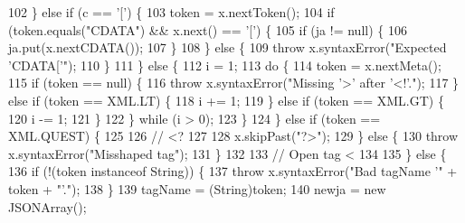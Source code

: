 \begin{DoxyCode}
102                         \} \textcolor{keywordflow}{else} \textcolor{keywordflow}{if} (c == \textcolor{charliteral}{'['}) \{
103                             token = x.nextToken();
104                             \textcolor{keywordflow}{if} (token.equals(\textcolor{stringliteral}{"CDATA"}) && x.next() == \textcolor{charliteral}{'['}) \{
105                                 \textcolor{keywordflow}{if} (ja != null) \{
106                                     ja.put(x.nextCDATA());
107                                 \}
108                             \} \textcolor{keywordflow}{else} \{
109                                 \textcolor{keywordflow}{throw} x.syntaxError(\textcolor{stringliteral}{"Expected 'CDATA['"});
110                             \}
111                         \} \textcolor{keywordflow}{else} \{
112                             i = 1;
113                             \textcolor{keywordflow}{do} \{
114                                 token = x.nextMeta();
115                                 \textcolor{keywordflow}{if} (token == null) \{
116                                     \textcolor{keywordflow}{throw} x.syntaxError(\textcolor{stringliteral}{"Missing '>' after '<!'."});
117                                 \} \textcolor{keywordflow}{else} \textcolor{keywordflow}{if} (token == XML.LT) \{
118                                     i += 1;
119                                 \} \textcolor{keywordflow}{else} \textcolor{keywordflow}{if} (token == XML.GT) \{
120                                     i -= 1;
121                                 \}
122                             \} \textcolor{keywordflow}{while} (i > 0);
123                         \}
124                     \} \textcolor{keywordflow}{else} \textcolor{keywordflow}{if} (token == XML.QUEST) \{
125 
126 \textcolor{comment}{// <?}
127 
128                         x.skipPast(\textcolor{stringliteral}{"?>"});
129                     \} \textcolor{keywordflow}{else} \{
130                         \textcolor{keywordflow}{throw} x.syntaxError(\textcolor{stringliteral}{"Misshaped tag"});
131                     \}
132 
133 \textcolor{comment}{// Open tag <}
134 
135                 \} \textcolor{keywordflow}{else} \{
136                     \textcolor{keywordflow}{if} (!(token instanceof String)) \{
137                         \textcolor{keywordflow}{throw} x.syntaxError(\textcolor{stringliteral}{"Bad tagName '"} + token + \textcolor{stringliteral}{"'."});
138                     \}
139                     tagName = (String)token;
140                     newja = \textcolor{keyword}{new} JSONArray();

\end{DoxyCode}
